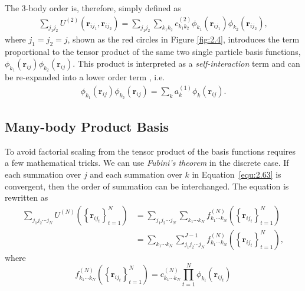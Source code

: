 The $3$-body order is, therefore, simply defined as
\begin{equation}
\label{equ:2.64}
\begin{split}
\sum_{{j}_{1}{j}_{2}}U^{(2)}(\mathbf{r}_{i{j}_{1}},\mathbf{r}_{i{j}_{2}})=
\sum_{{j}_{1}{j}_{2}}\sum_{{k}_{1}{k}_{2}}
c^{(2)}_{{k}_{1}{k}_{2}}\phi_{k_{1}}(\mathbf{r}_{i{j}_{1}})\phi_{k_{2}}(\mathbf{r}_{i{j}_{2}}),
\end{split}
\end{equation}
where $j_{1} = j_{2} = j$, shown as the red circles in Figure \ref{fig:2.4}, introduces the term proportional to the tensor product of the same two single particle basis functions, $\phi_{k_{1}}(\mathbf{r}_{ij})\phi_{k_{2}}(\mathbf{r}_{ij})$.
This product is interpreted as a \textit{self-interaction} term and can be re-expanded into a lower order term \cite{Drautz2019,Ho2024}, i.e.
\begin{equation}
\label{equ:2.65}
\begin{split}
\phi_{k_{1}}(\mathbf{r}_{ij})\phi_{k_{2}}(\mathbf{r}_{ij})=\sum_{k}
a^{(1)}_{k}\phi_{k}(\mathbf{r}_{ij}).
\end{split}
\end{equation}
\subsection{Many-body Product Basis} \label{sec:2.5.3}
To avoid factorial scaling from the tensor product of the basis functions requires a few mathematical tricks.
We can use \textit{Fubini's theorem} \cite{rudin1976principles} in the discrete case.
If each summation over $j$ and each summation over $k$ in Equation~\eqref{equ:2.63} is convergent, then the order of summation can be interchanged.
The equation is rewritten as
\begin{equation}
\label{equ:2.66}
\begin{split}
\sum_{{j}_{1}{j}_{2}\cdots{j}_{N}}U^{(N)}(\left\{\mathbf{r}_{ij_{t}}\right\}_{t=1}^{N})&=
\sum_{{j}_{1}{j}_{2}\cdots{j}_{N}}
\sum_{{k}_{1}\cdots{k}_{N}}
f^{(N)}_{{k}_{1}\cdots{k}_{N}}(\left\{\mathbf{r}_{ij_{t}}\right\}_{t=1}^{N})\\
&=\sum_{{k}_{1}\cdots{k}_{N}}
\sum^{J-1}_{{j}_{1}{j}_{2}\cdots{j}_{N}}
f^{(N)}_{{k}_{1}\cdots{k}_{N}}(\left\{\mathbf{r}_{ij_{t}}\right\}_{t=1}^{N}),
\end{split}
\end{equation}
where \[f^{(N)}_{{k}_{1}\cdots{k}_{N}}(\left\{\mathbf{r}_{ij_{t}}\right\}_{t=1}^{N}) = c^{(N)}_{{k}_{1}\cdots{k}_{N}}\prod_{t=1}^{N}\phi_{k_{t}}(\mathbf{r}_{i{j}_{t}})\]


